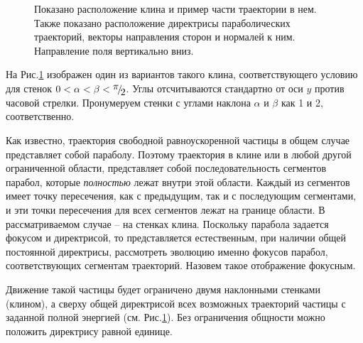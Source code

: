 \documentclass[a4paper]{article}
\begin{document}

\begin{figure}[h]
\caption{Показано расположение клина и пример части траектории в нем. Также показано расположение директрисы параболических траекторий, векторы направления сторон и нормалей	к ним. Направление поля вертикально вниз.}
\label{image4}
\end{figure}
На Рис.\ref{image4} изображен один из вариантов такого клина, соответствующего условию для стенок $0<\alpha <\beta <{\raise0.7ex\hbox{$ \pi  $}\!\mathord{\left/ {\vphantom {\pi  2}} \right. \kern-\nulldelimiterspace}\!\lower0.7ex\hbox{$ 2 $}} $. Углы отсчитываются стандартно от оси $y$ против часовой стрелки. Пронумеруем стенки с углами наклона $\alpha $ и $\beta $ как 1 и 2, соответственно.


Как известно, траектория свободной равноускоренной частицы в общем случае представляет собой параболу. Поэтому траектория в клине или в любой другой ограниченной области, представляет собой последовательность сегментов парабол, которые \textit{полностью} лежат внутри этой области. Каждый из сегментов имеет точку пересечения, как с предыдущим, так и с последующим сегментами, и эти точки пересечения для всех сегментов лежат на границе области. В рассматриваемом случае -- на стенках клина. Поскольку парабола задается фокусом и директрисой, то представляется естественным, при наличии общей постоянной директрисы, рассмотреть эволюцию именно фокусов парабол, соответствующих сегментам траекторий. Назовем такое отображение фокусным.


Движение такой частицы будет ограничено двумя наклонными стенками (клином), а сверху общей директрисой всех возможных траекторий частицы с заданной полной энергией (см. Рис.\ref{image4}). Без ограничения общности можно положить директрису равной единице.
\end{document}
